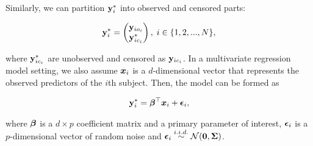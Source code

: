 \documentclass{interact}
\theoremstyle{plain}
\theoremstyle{definition}
\theoremstyle{remark}
\begin{document}
Similarly, we can partition $\mathbf{y}_i^*$ into observed and censored parts: 
\begin{linenomath}
\begin{align*}\mathbf{y}_i^*=\begin{pmatrix}
                \mathbf{y}_{io_{i}}\\
                \mathbf{y}_{ic_{i}}^*
            \end{pmatrix},\; i\in \{1,2,...,N\},
\end{align*}
\end{linenomath}
where $\mathbf{y}_{ic_{i}}^*$ are unobserved and censored as $\mathbf{y}_{ic_{i}}$. In a multivariate regression model setting, we also assume $\bm{x}_i$ is a $d$-dimensional vector that represents the observed predictors of the $i$th subject. Then, the model can be formed as 
\begin{linenomath}
\begin{align}
    \mathbf{y}_i^*={\bm \beta}^\top\bm{x}_i+\bm{\epsilon}_i,\label{eq:model_tobit}
\end{align}
\end{linenomath}
where ${\bm \beta}$ is a $d\times p$ coefficient matrix and a primary parameter of interest, $\bm{\epsilon}_i$ is a $p$-dimensional vector of random noise and  $\bm{\epsilon}_i\overset{i.i.d.}{\sim} \mathcal{N}(\mathbf{0},\bm{\Sigma})$. %
\end{document}
